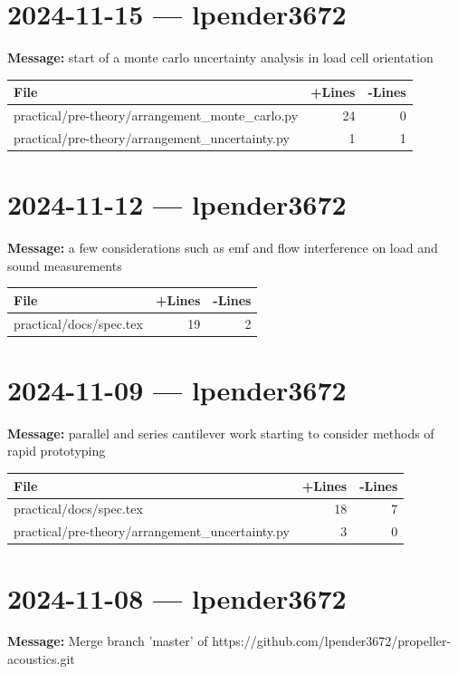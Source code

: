 \documentclass{article}
\begin{document}
\section*{2024-11-15 --- lpender3672}
\textbf{Message:} start of a monte carlo uncertainty analysis in load cell orientation

\begin{longtable}{|p{10cm}|r|r|}
\hline \textbf{File} & \textbf{+Lines} & \textbf{-Lines} \\
\hline
practical/pre-theory/arrangement\_monte\_carlo.py & 24 & 0 \\
\hline
practical/pre-theory/arrangement\_uncertainty.py & 1 & 1 \\
\hline
\end{longtable}

\section*{2024-11-12 --- lpender3672}
\textbf{Message:} a few considerations such as emf and flow interference on load and sound measurements

\begin{longtable}{|p{10cm}|r|r|}
\hline \textbf{File} & \textbf{+Lines} & \textbf{-Lines} \\
\hline
practical/docs/spec.tex & 19 & 2 \\
\hline
\end{longtable}

\section*{2024-11-09 --- lpender3672}
\textbf{Message:} parallel and series cantilever work starting to consider methods of rapid prototyping

\begin{longtable}{|p{10cm}|r|r|}
\hline \textbf{File} & \textbf{+Lines} & \textbf{-Lines} \\
\hline
practical/docs/spec.tex & 18 & 7 \\
\hline
practical/pre-theory/arrangement\_uncertainty.py & 3 & 0 \\
\hline
\end{longtable}

\section*{2024-11-08 --- lpender3672}
\textbf{Message:} Merge branch 'master' of https://github.com/lpender3672/propeller-acoustics.git
\end{document}
